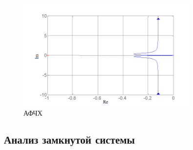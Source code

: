 \documentclass[a4paper, 12pt]{article}
\begin{document}
\begin{figure}[h]
	\centering
	\includegraphics[width = 0.8\textwidth]{2}
	\caption{АФЧХ}
\end{figure}
\newpage
\begin{center}
	\section{Анализ замкнутой системы}
\end{center}
\end{document}
